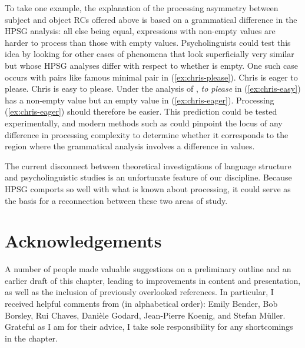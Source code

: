 \documentclass[output=paper
 	        ,biblatex
                ,babelshorthands
                ,newtxmath
                ,draftmode
                ,colorlinks, citecolor=brown
]{langscibook}
\begin{document}
To take one example, the explanation of the processing asymmetry between subject and object RCs
offered above is based on a grammatical difference in the HPSG analysis:  all else being equal,
expressions with non-empty \isi{\slasch} values are harder to process than those with empty \slasch
values.  Psycholinguists could test this idea by looking for other cases of phenomena that look
superficially very similar but whose HPSG analyses differ with respect to whether \slasch is empty.
One such case occurs with pairs like  famous minimal pair in
(\ref{ex:chris-please}). 
\eal\label{ex:chris-please}
\ex Chris is eager to please.\label{ex:chris-eager}
\ex Chris is easy to please.\label{ex:chris-easy}
\zl
Under the analysis of \citet[Section~4.3]{ps2}, \emph{to please} in (\ref{ex:chris-easy}) has a non-empty
\isi{\slasch} value but an empty \slasch value in (\ref{ex:chris-eager}).  Processing
(\ref{ex:chris-eager}) should therefore be easier.  This prediction could be tested experimentally,
and modern methods such as  could pinpoint the locus of any difference in
processing complexity to determine whether it corresponds to the region where the grammatical
analysis involves a difference in \isi{\slasch} values. 

The current disconnect between theoretical investigations of language structure and psycholinguistic
studies is an unfortunate feature of our discipline.  Because HPSG comports so well with what is
known about processing, it could serve as the basis for a reconnection between these two areas of
study. 

\section*{Acknowledgements}

A number of people made valuable suggestions on a preliminary outline and an earlier draft of this
chapter, leading to improvements in content and presentation, as well as the inclusion of previously
overlooked references.  In particular, I received helpful comments from (in alphabetical order):
Emily Bender, Bob Borsley, Rui Chaves, Danièle Godard, Jean-Pierre Koenig, and Stefan Müller.
Grateful as I am for their advice, I take sole responsibility for any shortcomings in the chapter. 

{\sloppy
\printbibliography[heading=subbibliography,notkeyword=this] 
}
\end{document}
